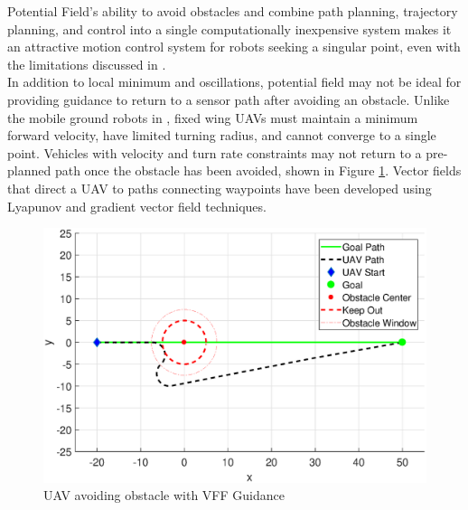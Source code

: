\documentclass[numbered,pdftex]{ohio-etd}
\begin{document}
Potential Field's ability to avoid obstacles and combine path planning, trajectory planning, and control into a single computationally inexpensive system makes it an attractive motion control system for robots seeking a singular point, even with the limitations discussed in \cite{koren_potential_1991}. \\

In addition to local minimum and oscillations, potential field may not be ideal for providing guidance to return to a sensor path after avoiding an obstacle. Unlike the mobile ground robots in \cite{borenstein_real-time_1990}, fixed wing UAVs must maintain a minimum forward velocity, have limited turning radius, and cannot converge to a single point. Vehicles with velocity and turn rate constraints may not return to a pre-planned path once the obstacle has been avoided, shown in Figure \ref{fig:vffSimulated}. Vector fields that direct a UAV to paths connecting waypoints have been developed using Lyapunov and gradient vector field techniques. 


\begin{figure}[H]
	\centering
	\includegraphics[width=15cm]{PaperFigures/Literature/vffSimulated}
	\caption{UAV avoiding obstacle with VFF Guidance}
	\label{fig:vffSimulated}
\end{figure}
\end{document}
